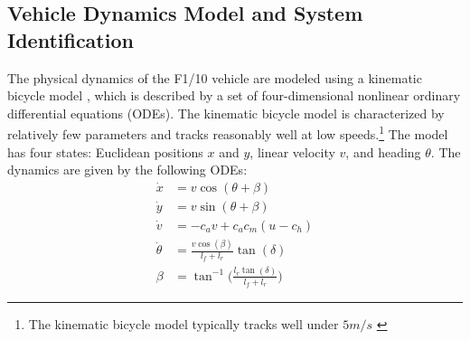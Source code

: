 \documentclass[manuscript,screen,review]{acmart}
\newcommand{\todo}[1]{\textcolor{red}{\textbf{\underline{TODO:}} #1}}
\begin{document}

\subsection{Vehicle Dynamics Model and System Identification}


The physical dynamics of the F1/10 vehicle are modeled using a kinematic bicycle model \cite{Rajamani2012}, which is described by a set of four-dimensional nonlinear ordinary differential equations (ODEs). The kinematic bicycle model is characterized by relatively few parameters and tracks reasonably well at low speeds.\footnote{ The kinematic bicycle model typically tracks well under $5 m/s$ \cite{ivanov2020case}} The model has four states: Euclidean positions $x$ and $y$, linear velocity $v$, and heading $\theta$. The dynamics are given by the following ODEs: 
\begin{align*}
    \Dot{x} & = v\cos(\theta +\beta)\\
    \Dot{y} & = v\sin(\theta + \beta)\\
    \Dot{v} & = -c_av +c_ac_m(u-c_h)\\
    \Dot{\theta} & = \frac{v\cos(\beta)}{l_f+l_r}\tan(\delta)\\
    \beta &= \tan^{-1}\Big(\frac{l_r\tan(\delta)}{l_f+l_r}\Big)
\end{align*}
\end{document}
